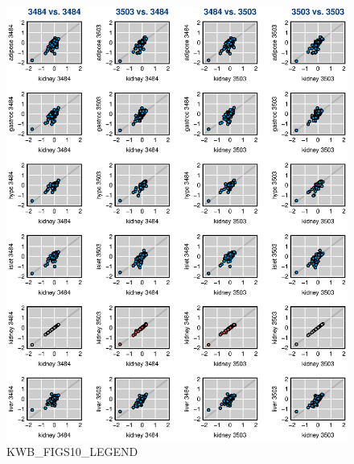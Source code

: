 \documentclass[letterpaper,twoside]{article}
\begin{document}
\begin{figure}[p]
\centerline{\includegraphics{SuppFigs/figS10.eps}}

\caption{KWB_FIGS10_LEGEND}
\end{figure}


\clearpage
\end{document}
